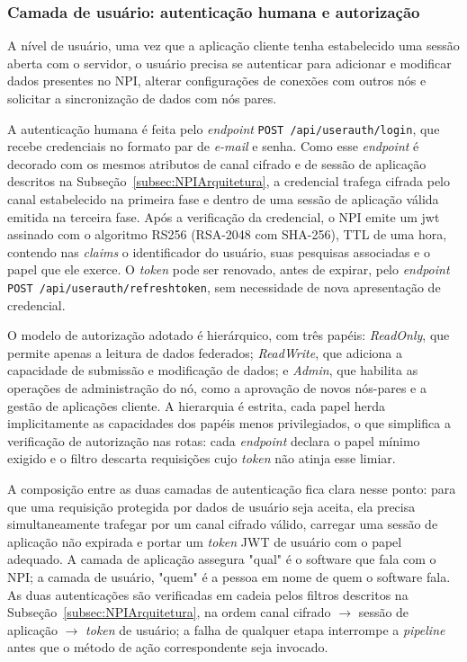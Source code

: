 \subsubsection{Camada de usuário: autenticação humana e autorização}

A nível de usuário, uma vez que a aplicação cliente tenha estabelecido uma sessão aberta com o servidor, o usuário precisa se autenticar para adicionar e modificar dados presentes no NPI, alterar configurações de conexões com outros nós e solicitar a sincronização de dados com nós pares.

A autenticação humana é feita pelo \textit{endpoint} \texttt{POST /api/userauth/login}, que recebe credenciais no formato par de \textit{e-mail} e senha. Como esse \textit{endpoint} é decorado com os mesmos atributos de canal cifrado e de sessão de aplicação descritos na Subseção~\ref{subsec:NPIArquitetura}, a credencial trafega cifrada pelo canal estabelecido na primeira fase e dentro de uma sessão de aplicação válida emitida na terceira fase. Após a verificação da credencial, o NPI emite um \gls{jwt} \cite{rfc7519} assinado com o algoritmo RS256 (RSA-2048 com SHA-256), TTL de uma hora, contendo nas \textit{claims} o identificador do usuário, suas pesquisas associadas e o papel que ele exerce. O \textit{token} pode ser renovado, antes de expirar, pelo \textit{endpoint} \texttt{POST /api/userauth/refreshtoken}, sem necessidade de nova apresentação de credencial.

O modelo de autorização adotado é hierárquico, com três papéis: \textit{ReadOnly}, que permite apenas a leitura de dados federados; \textit{ReadWrite}, que adiciona a capacidade de submissão e modificação de dados; e \textit{Admin}, que habilita as operações de administração do nó, como a aprovação de novos nós-pares e a gestão de aplicações cliente. A hierarquia é estrita, cada papel herda implicitamente as capacidades dos papéis menos privilegiados, o que simplifica a verificação de autorização nas rotas: cada \textit{endpoint} declara o papel mínimo exigido e o filtro descarta requisições cujo \textit{token} não atinja esse limiar.

A composição entre as duas camadas de autenticação fica clara nesse ponto: para que uma requisição protegida por dados de usuário seja aceita, ela precisa simultaneamente trafegar por um canal cifrado válido, carregar uma sessão de aplicação não expirada e portar um \textit{token} JWT de usuário com o papel adequado. A camada de aplicação assegura "qual" é o software que fala com o NPI; a camada de usuário, "quem" é a pessoa em nome de quem o software fala. As duas autenticações são verificadas em cadeia pelos filtros descritos na Subseção~\ref{subsec:NPIArquitetura}, na ordem canal cifrado $\rightarrow$ sessão de aplicação $\rightarrow$ \textit{token} de usuário; a falha de qualquer etapa interrompe a \textit{pipeline} antes que o método de ação correspondente seja invocado.
